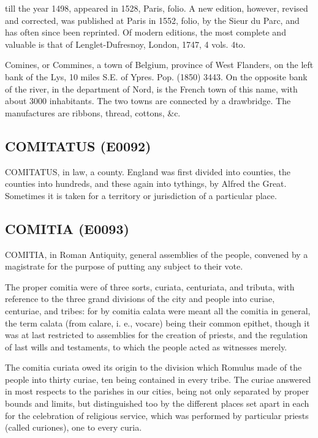 \documentclass{article}
\begin{document}
till the year 1498, appeared in 1528, Paris, folio. A new edition, however, revised and corrected, was published at Paris in 1552, folio, by the Sieur du Parc, and has often since been reprinted. Of modern editions, the most complete and valuable is that of Lenglet-Dufresnoy, London, 1747, 4 vols. 4to.

Comines, or Commines, a town of Belgium, province of West Flanders, on the left bank of the Lys, 10 miles S.E. of Ypres. Pop. (1850) 3443. On the opposite bank of the river, in the department of Nord, is the French town of this name, with about 3000 inhabitants. The two towns are connected by a drawbridge. The manufactures are ribbons, thread, cottons, \&c.

\subsection*{COMITATUS (E0092)}
COMITATUS, in law, a county. England was first divided into counties, the counties into hundreds, and these again into tythings, by Alfred the Great. Sometimes it is taken for a territory or jurisdiction of a particular place.

\subsection*{COMITIA (E0093)}
COMITIA, in Roman Antiquity, general assemblies of the people, convened by a magistrate for the purpose of putting any subject to their vote.

The proper comitia were of three sorts, curiata, centuriata, and tributa, with reference to the three grand divisions of the city and people into curiae, centuriae, and tribes: for by comitia calata were meant all the comitia in general, the term calata (from calare, i. e., vocare) being their common epithet, though it was at last restricted to assemblies for the creation of priests, and the regulation of last wills and testaments, to which the people acted as witnesses merely.

The comitia curiata owed its origin to the division which Romulus made of the people into thirty curiae, ten being contained in every tribe. The curiae answered in most respects to the parishes in our cities, being not only separated by proper bounds and limits, but distinguished too by the different places set apart in each for the celebration of religious service, which was performed by particular priests (called curiones), one to every curia.
\end{document}
